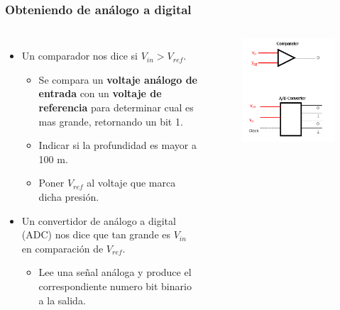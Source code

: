 \documentclass[10.5pt,scale=1.0,t,aspectratio=169,hyperref={pdfpagelabels=false}]{beamer}
\begin{document}
\begin{frame}
	\frametitle{Obteniendo de análogo a digital}
	\begin{columns}
		\begin{itemize}
			\setlength\itemsep{1.5cm}
			\item Un comparador nos dice si $V_{in}>V_{ref}$.
			\begin{itemize}
				\item Se compara un \textbf{voltaje análogo de entrada} con un \textbf{voltaje de referencia} para determinar cual es mas grande, retornando un bit 1. 
				\item Indicar si la profundidad es mayor a 100 m.
				\item Poner $V_{ref}$ al voltaje que marca dicha presión. 
			\end{itemize}
			\item Un convertidor de análogo a digital (ADC) nos dice que tan grande es $V_{in}$ en comparación de $V_{ref}$.
			\begin{itemize}
				\item Lee una señal análoga y produce el correspondiente numero bit binario a la salida. 
			\end{itemize}
		\end{itemize}
	
		\begin{figure}
			\centering\includegraphics[scale=0.45]{fig_ComparatorADC}
		\end{figure}
	\end{columns}
\end{frame}
\end{document}
